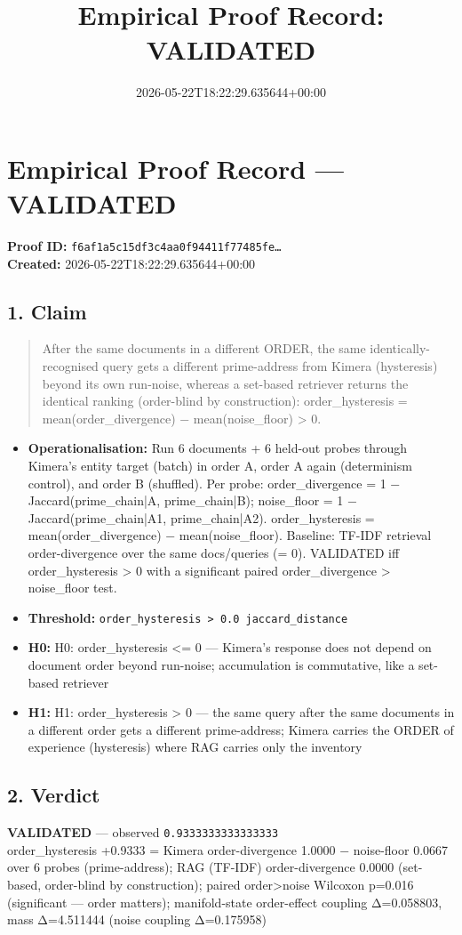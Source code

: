 \documentclass{article}
\title{Empirical Proof Record: VALIDATED}
\date{2026-05-22T18:22:29.635644+00:00}
\begin{document}
\maketitle
\section*{Empirical Proof Record --- \textcolor{validated}{\textbf{VALIDATED}}}
\textbf{Proof ID:} \texttt{f6af1a5c15df3c4aa0f94411f77485fe\dots}\\
\textbf{Created:} 2026-05-22T18:22:29.635644+00:00
\subsection*{1. Claim}
\begin{quote}After the same documents in a different ORDER, the same identically-recognised query gets a different prime-address from Kimera (hysteresis) beyond its own run-noise, whereas a set-based retriever returns the identical ranking (order-blind by construction): order\_hysteresis = mean(order\_divergence) − mean(noise\_floor) > 0.\end{quote}
\begin{itemize}
\item \textbf{Operationalisation:} Run 6 documents + 6 held-out probes through Kimera's entity target (batch) in order A, order A again (determinism control), and order B (shuffled). Per probe: order\_divergence = 1 − Jaccard(prime\_chain|A, prime\_chain|B); noise\_floor = 1 − Jaccard(prime\_chain|A1, prime\_chain|A2). order\_hysteresis = mean(order\_divergence) − mean(noise\_floor). Baseline: TF-IDF retrieval order-divergence over the same docs/queries (= 0). VALIDATED iff order\_hysteresis > 0 with a significant paired order\_divergence > noise\_floor test.
\item \textbf{Threshold:} \texttt{order\_hysteresis > 0.0 jaccard\_distance}
\item \textbf{H0:} H0: order\_hysteresis <= 0 — Kimera's response does not depend on document order beyond run-noise; accumulation is commutative, like a set-based retriever
\item \textbf{H1:} H1: order\_hysteresis > 0 — the same query after the same documents in a different order gets a different prime-address; Kimera carries the ORDER of experience (hysteresis) where RAG carries only the inventory
\end{itemize}
\subsection*{2. Verdict}
\textcolor{validated}{\textbf{VALIDATED}} --- observed \texttt{0.9333333333333333}\\
order\_hysteresis +0.9333 = Kimera order-divergence 1.0000 − noise-floor 0.0667 over 6 probes (prime-address); RAG (TF-IDF) order-divergence 0.0000 (set-based, order-blind by construction); paired order>noise Wilcoxon p=0.016 (significant — order matters); manifold-state order-effect coupling Δ=0.058803, mass Δ=4.511444 (noise coupling Δ=0.175958)
\end{document}
